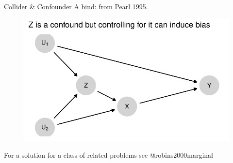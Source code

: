 \documentclass[
  11pt,
  ignorenonframetext,
]{beamer}
\begin{document}
\begin{frame}{Collider \& Confounder}
\protect\hypertarget{collider-confounder}{}
A bind: from Pearl 1995.

\begin{figure}

{\centering \includegraphics{0_lectures_files/figure-beamer/unnamed-chunk-250-1.pdf}

}

\end{figure}

For a solution for a class of related problems see @robins2000marginal
\end{frame}
\end{document}
